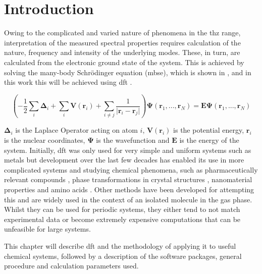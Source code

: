 \section{Introduction}
Owing to the complicated and varied nature of phenomena in the \acrshort{thz} range, interpretation of the measured spectral properties requires calculation of the nature, frequency and intensity of the underlying modes. These, in turn, are calculated from the electronic ground state of the system. This is achieved by solving the many-body Schr\"{o}dinger equation (\acrshort{mbse}), which is shown in , and in this work this will be achieved using \acrfull{dft} \DIFdelbegin \DIFdel{~}\DIFdelend \cite{Kohn1965}.

\begin{equation}
\left( -\frac{1}{2}\sum_i\boldsymbol{\Delta}_i + \sum_i \boldsymbol{V}(\mathbf{r}_i) + \sum_{i\neq j}\frac{1}{ \lvert \mathbf{r}_i - \mathbf{r}_j \rvert } \right) \boldsymbol{\Psi} (\mathbf{r}_1, ..., \mathbf{r}_N) = \boldsymbol{E}\boldsymbol{\Psi} (\mathbf{r}_1, ..., \mathbf{r}_N)
\label{eqn:MBSE}
\end{equation}

\(\boldsymbol{\Delta}_i\) is the Laplace Operator acting on atom \(i\), \(\boldsymbol{V}(\mathbf{r}_i)\) is the potential energy, \(\mathbf{r}_i\) is the nuclear coordinates, \(\boldsymbol{\Psi}\) is the wavefunction and \(\boldsymbol{E}\) is the energy of the system. Initially, \acrshort{dft} was only used for very simple and uniform systems such as metals but development over the last few decades has enabled its use in \DIFdelbegin {}\DIFdelend \DIFaddbegin {}\DIFaddend more complicated systems and studying chemical phenomena, such as pharmaceutically relevant compounds \DIFdelbegin \DIFdel{~}\DIFdelend \cite{Berzins2020}, phase transformations in crystal structures \DIFdelbegin \DIFdel{~}\DIFdelend \cite{Ruggiero2018, Paul2019}, nanomaterial properties \DIFdelbegin \DIFdel{~}\DIFdelend \cite{Makkar2021} and amino acids \DIFdelbegin \DIFdel{~}\DIFdelend \cite{Hachtel2019}. Other methods have been developed for attempting this and are widely used in the context of an isolated molecule in the gas phase. Whilst they can be used for periodic systems, they either tend to not match experimental data or become extremely expensive computations that can be unfeasible for large systems.

This chapter will describe \acrshort{dft} and the methodology of applying it to useful chemical systems, followed by a description of the software packages, general procedure and calculation parameters used. 

